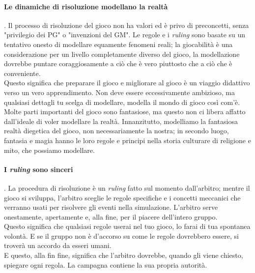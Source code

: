 \paragraph{Le dinamiche di risoluzione modellano la realtà}. Il processo di risoluzione del gioco non ha valori ed è privo di preconcetti, senza "privilegio dei PG" o "invenzioni del GM". Le regole e i \textit{ruling} sono basate su un tentativo onesto di modellare equamente fenomeni reali; la giocabilità è una considerazione per un livello completamente diverso del gioco, la modellazione dovrebbe puntare coraggiosamente a ciò che è vero piuttosto che a ciò che è conveniente.\\
Questo significa che preparare il gioco e migliorare al gioco è un viaggio didattivo verso un vero apprendimento. Non deve essere eccessivamente ambizioso, ma qualsiasi dettagli tu scelga di modellare, modella il mondo di gioco così com'è.\\
Molte parti importanti del gioco sono fantasiose, ma questo non ci libera affatto dall'ideale di voler modellare la realtà. Innanzitutto, modelliamo la fantasiosa realtà diegetica del gioco, non necessariamente la nostra; in secondo luogo, fantasia e magia hanno le loro regole e principi nella storia culturare di religione e mito, che possiamo modellare.

\paragraph{I \textit{ruling} sono sinceri}. La procedura di risoluzione è un \textit{ruling} fatto sul momento dall'arbitro; mentre il gioco si sviluppa, l'arbitro sceglie le regole specifiche e i concetti meccanici che verranno usati per risolvere gli eventi nella simulazione. L'arbitro serve onestamente, apertamente e, alla fine, per il piacere dell'intero gruppo.\\
Questo significa che qualsiasi regole userai nel tuo gioco, lo farai di tua spontanea volontà. E se il gruppo non è d'accorso su come le regole dovrebbero essere, si troverà un accordo da esseri umani.\\
E questo, alla fin fine, significa che l'arbitro dovrebbe, quando gli viene chiesto, spiegare ogni regola. La campagna contiene la sua propria autorità.

